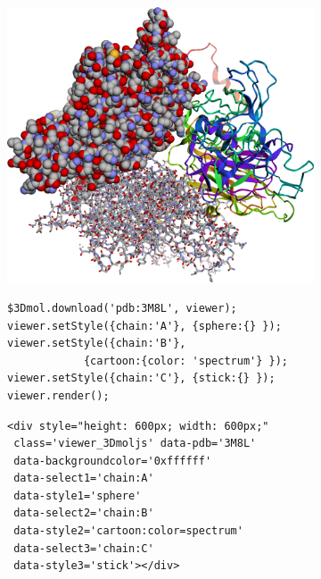 \documentclass[]{bioinfo}
\begin{document}
\begin{figure}
\centering
\begin{minipage}[b]{.9\linewidth}
\begin{subfigure}[b]{\linewidth} \centering
\includegraphics[width=\linewidth]{screenshot}
\caption{}\label{pic}
\end{subfigure}
\end{minipage}

\begin{minipage}[b]{\linewidth}

\begin{subfigure}[b]{\linewidth} \centering
\begin{verbatim}
$3Dmol.download('pdb:3M8L', viewer);
viewer.setStyle({chain:'A'}, {sphere:{} });
viewer.setStyle({chain:'B'}, 
            {cartoon:{color: 'spectrum'} });
viewer.setStyle({chain:'C'}, {stick:{} });
viewer.render();
\end{verbatim}
\caption{}\label{code}
\end{subfigure}

\begin{subfigure}[b]{\linewidth} \centering
\begin{verbatim}
<div style="height: 600px; width: 600px;" 
 class='viewer_3Dmoljs' data-pdb='3M8L'
 data-backgroundcolor='0xffffff'  
 data-select1='chain:A'
 data-style1='sphere'
 data-select2='chain:B'
 data-style2='cartoon:color=spectrum'
 data-select3='chain:C'
 data-style3='stick'></div>
\end{verbatim}
\caption{}\label{embed}
\end{subfigure}


\end{minipage}
\end{figure}
\end{document}
